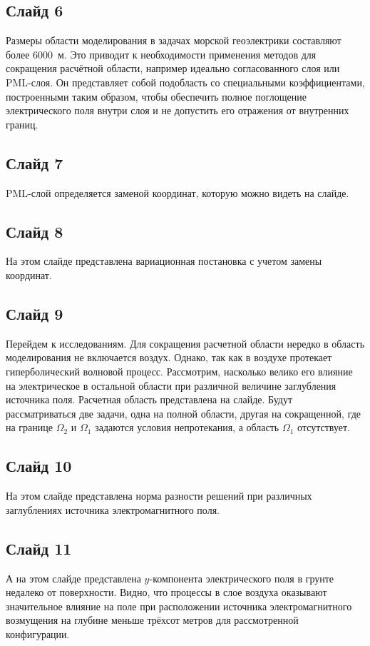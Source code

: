 \documentclass[a4paper,10pt]{article}
\begin{document}
\subsection*{Слайд 6}
Размеры области моделирования в задачах морской геоэлектрики составляют более 6000~м. Это приводит к необходимости применения методов для сокращения расчётной области, например идеально согласованного слоя или PML-слоя. Он представляет собой подобласть со специальными коэффициентами, построенными таким образом, чтобы обеспечить полное поглощение электрического поля внутри слоя и не допустить его отражения от внутренних границ.

\subsection*{Слайд 7}
PML-слой определяется заменой координат, которую можно видеть на слайде.

\subsection*{Слайд 8}
На этом слайде представлена вариационная постановка с учетом замены координат.

\subsection*{Слайд 9}
Перейдем к исследованиям. Для сокращения расчетной области нередко в область моделирования не включается воздух. Однако, так как в воздухе протекает гиперболический волновой процесс. Рассмотрим, насколько велико его влияние на электрическое в остальной области при различной величине заглубления источника поля. Расчетная область представлена на слайде. Будут рассматриваться две задачи, одна на полной области, другая на сокращенной, где на границе $\Omega_2$ и $\Omega_1$ задаются условия непротекания, а область $\Omega_1$ отсутствует.

\subsection*{Слайд 10}
На этом слайде представлена норма разности решений при различных заглублениях источника электромагнитного поля.

\subsection*{Слайд 11}
А на этом слайде представлена $y$-компонента электрического поля в грунте недалеко от поверхности. Видно, что процессы в слое воздуха оказывают значительное влияние на поле при расположении источника электромагнитного возмущения на глубине меньше трёхсот метров для рассмотренной конфигурации.
\end{document}

